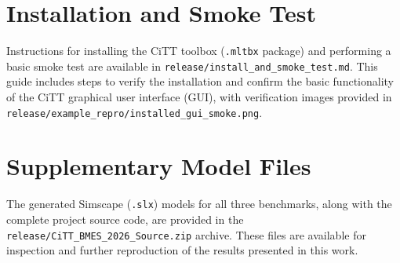\documentclass[10pt,twocolumn,letterpaper]{article}
\begin{document}
\section{Installation and Smoke Test}
\label{sec:appendix_install_smoke}
Instructions for installing the CiTT toolbox (\texttt{.mltbx} package) and performing a basic smoke test are available in \texttt{release/install\_and\_smoke\_test.md}. This guide includes steps to verify the installation and confirm the basic functionality of the CiTT graphical user interface (GUI), with verification images provided in \texttt{release/example\_repro/installed\_gui\_smoke.png}.

\section{Supplementary Model Files}
\label{sec:appendix_models}
The generated Simscape (\texttt{.slx}) models for all three benchmarks, along with the complete project source code, are provided in the \texttt{release/CiTT\_BMES\_2026\_Source.zip} archive. These files are available for inspection and further reproduction of the results presented in this work.
\end{document}
